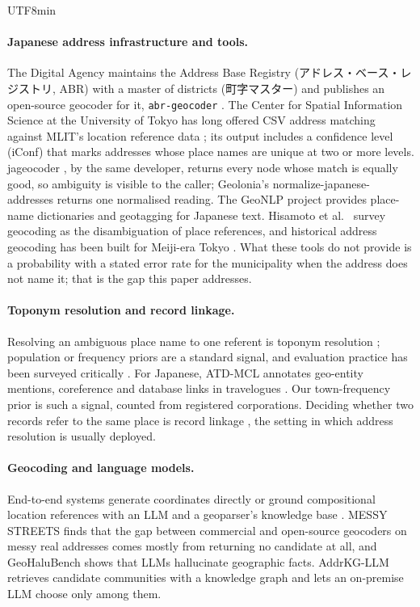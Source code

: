 \documentclass[10pt]{article}
\begin{document}
\begin{CJK}{UTF8}{min}
\paragraph{Japanese address infrastructure and tools.} The Digital Agency maintains the Address Base
Registry (アドレス・ベース・レジストリ, ABR) with a master of districts (町字マスター) and publishes an
open-source geocoder for it, \texttt{abr-geocoder} \cite{abr}. The Center for Spatial Information Science
at the University of Tokyo has long offered CSV address matching against MLIT's location reference data
\cite{csis}; its output includes a confidence level (iConf) that marks addresses whose place names are
unique at two or more levels. jageocoder \cite{jageocoder}, by the same developer, returns every node whose
match is equally good, so ambiguity is visible to the caller; Geolonia's normalize-japanese-addresses
\cite{geolonia} returns one normalised reading. The GeoNLP project \cite{geonlp} provides place-name
dictionaries and geotagging for Japanese text. Hisamoto et al.\ \cite{hisamoto} survey geocoding as the
disambiguation of place references, and historical address geocoding has been built for Meiji-era Tokyo
\cite{ishikawa}. What these tools do not provide is a probability with a stated error rate for the
municipality when the address does not name it; that is the gap this paper addresses.

\paragraph{Toponym resolution and record linkage.} Resolving an ambiguous place name to one referent is
toponym resolution \cite{leidner}; population or frequency priors are a standard signal, and evaluation
practice has been surveyed critically \cite{gritta}. For Japanese, ATD-MCL annotates geo-entity
mentions, coreference and database links in travelogues \cite{atdmcl}. Our town-frequency prior is such a
signal, counted from registered corporations. Deciding whether two records refer to the same place is
record linkage \cite{fellegi}, the setting in which address resolution is usually deployed.

\paragraph{Geocoding and language models.} End-to-end systems generate coordinates directly
\cite{reageo} or ground compositional location references with an LLM and a geoparser's knowledge base
\cite{masis}. MESSY STREETS \cite{messy} finds that the gap between commercial and open-source geocoders
on messy real addresses comes mostly from returning no candidate at all, and GeoHaluBench \cite{geohalu}
shows that LLMs hallucinate geographic facts. AddrKG-LLM \cite{addrkg} retrieves candidate communities
with a knowledge graph and lets an on-premise LLM choose only among them.


\end{CJK}
\end{document}

